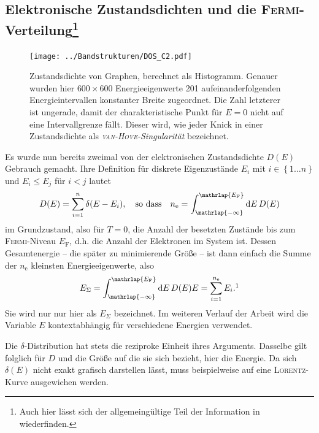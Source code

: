 \documentclass[a4paper, 10pt, twoside, openany]{book} %
\newcommand \braces[1]{\left \lbrace #1 \right \rbrace}
\def \D {\mathrm d}
\def \nE {n_\mathrm{e}}
\begin{document}
	\subsection[Elektronische Zustandsdichten und die \textsc{Fermi}-Verteilung]{Elektronische Zustandsdichten und die \textsc{Fermi}-Verteilung\footnote{Auch hier lässt sich der allgemeingültige Teil der Information in \cite[S.~132f]{Czycholl} wiederfinden.}}
	\label{Zustandsdichte}
	
	\begin{figure}
		\texttt{[image: ../Bandstrukturen/DOS\_C2.pdf]}
		\caption[Zustandsdichte von Graphen]{Zustandsdichte von Graphen, berechnet als Histogramm. Genauer wurden hier $600 \times 600$ Energieeigenwerte 201 aufeinanderfolgenden Energieintervallen konstanter Breite zugeordnet. Die Zahl letzterer ist ungerade, damit der charakteristische Punkt für $E = 0$ nicht auf eine Intervallgrenze fällt. Dieser wird, wie jeder Knick in einer Zustandsdichte als \emph{\textsc{van-Hove}-Singularität} \cite{vanHove} bezeichnet.}
		\label{DOS Graphen}
	\end{figure}
	Es wurde nun bereits zweimal von der elektronischen Zustandsdichte $D(E)$ Gebrauch gemacht. Ihre Definition für diskrete Eigenzustände $E_i$ mit $i \in \braces{1 \dots n}$ und $E_i \leq E_j$ für $i < j$ lautet
	\begin{align*}
		D(E) = \sum_{i = 1}^n \delta(E - E_i), \quad \text{so dass} \quad \nE = \int_{\mathrlap{-\infty}}^{\mathrlap{E_\mathrm{F}}} \D E \, D(E)
	\end{align*}
	im Grundzustand, also für $T = 0$, die Anzahl der besetzten Zustände bis zum \textsc{Fermi}-Niveau $E_\mathrm{F}$, d.h. die Anzahl der Elektronen im System ist. Dessen Gesamtenergie -- die später zu minimierende Größe -- ist dann einfach die Summe der $\nE$ kleinsten Energieeigenwerte, also
	\begin{align*}
		E_\Sigma = \int_{\mathrlap{-\infty}}^{\mathrlap{E_\mathrm{F}}} \D E \, D(E) E = \sum_{i = 1}^{\nE} E_i.\footnotemark
	\end{align*}
	Sie wird nur nur hier als $E_\Sigma$ bezeichnet. Im weiteren Verlauf der Arbeit wird die Variable $E$ kontextabhängig für verschiedene Energien verwendet.
	
	Die $\delta$-Distribution hat stets die reziproke Einheit ihres Arguments. Dasselbe gilt folglich für $D$ und die Größe auf die sie sich bezieht, hier die Energie. Da sich $\delta(E)$ nicht exakt grafisch darstellen lässt, muss beispielweise auf eine \textsc{Lorentz}-Kurve ausgewichen werden.
	
\end{document}
